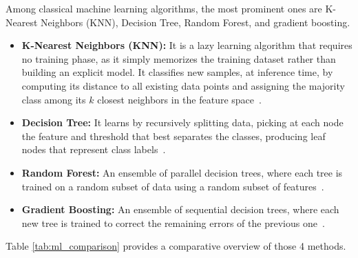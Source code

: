 Among classical machine learning algorithms, the most prominent ones are K-Nearest Neighbors (KNN), Decision Tree, Random Forest, and gradient boosting.
\vspace{2cm}
\begin{itemize}
    \item \textbf{K-Nearest Neighbors (KNN):} It is a lazy learning algorithm that requires no training phase, as it simply memorizes the training dataset rather than building an explicit model. It classifies new samples, at inference time, by computing its distance to all existing data points and assigning the majority class among its $k$ closest neighbors in the feature space~\cite{KNN-INT}.
    \item \textbf{Decision Tree:} It learns by recursively splitting data, picking at each node the feature and threshold that best separates the classes, producing leaf nodes that represent class labels~\cite{DT-INT}.
    \item \textbf{Random Forest:} An ensemble of parallel decision trees, where each tree is trained on a random subset of data using a random subset of features~\cite{RF-INT}.
    \item \textbf{Gradient Boosting:} An ensemble of sequential decision trees, where each new tree is trained to correct the remaining errors of the previous one~\cite{GB-INT}.
\end{itemize}

Table \ref{tab:ml_comparison} provides a comparative overview of those 4 methods.

